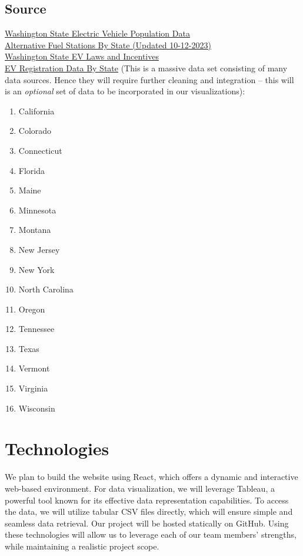 \documentclass{article}
\begin{document}
\subsection{Source}
\href{https://data.wa.gov/Transportation/Electric-Vehicle-Population-Data/f6w7-q2d2}{Washington State Electric Vehicle Population Data}\vspace*{5pt}\\
\href{https://afdc.energy.gov/data_download}{Alternative Fuel Stations By State (Updated 10-12-2023)}\vspace*{5pt}\\
\href{https://afdc.energy.gov/data_download}{Washington State EV Laws and Incentives}\vspace*{5pt}\\
\href{https://www.atlasevhub.com/materials/state-ev-registration-data/}{EV
Registration Data By State} (This is a massive data set consisting of many data
sources.  Hence they will require further cleaning and integration -- this will
is an \emph{optional} set of data to be incorporated in our visualizations):
\begin{multicols}{4}
    \begin{enumerate}[topsep=0pt, partopsep=0pt, itemsep=1pt, parsep=1pt]
        \item California
        \item Colorado
        \item Connecticut
        \item Florida
        \item Maine
        \item Minnesota
        \item Montana
        \item New Jersey
        \item New York
        \item North Carolina
        \item Oregon
        \item Tennessee
        \item Texas
        \item Vermont
        \item Virginia
        \item Wisconsin
    \end{enumerate}
\end{multicols}

\section{Technologies}
We plan to build the website using React, which offers a dynamic and interactive 
web-based environment. For data visualization, we will leverage Tableau, 
a powerful tool known for its effective data representation capabilities. 
To access the data, we will utilize tabular CSV files directly, which will
ensure simple and seamless data retrieval. Our project will be hosted statically
on GitHub. Using these technologies will allow us to leverage each of our team
members' strengths, while maintaining a realistic project scope.
\end{document}
